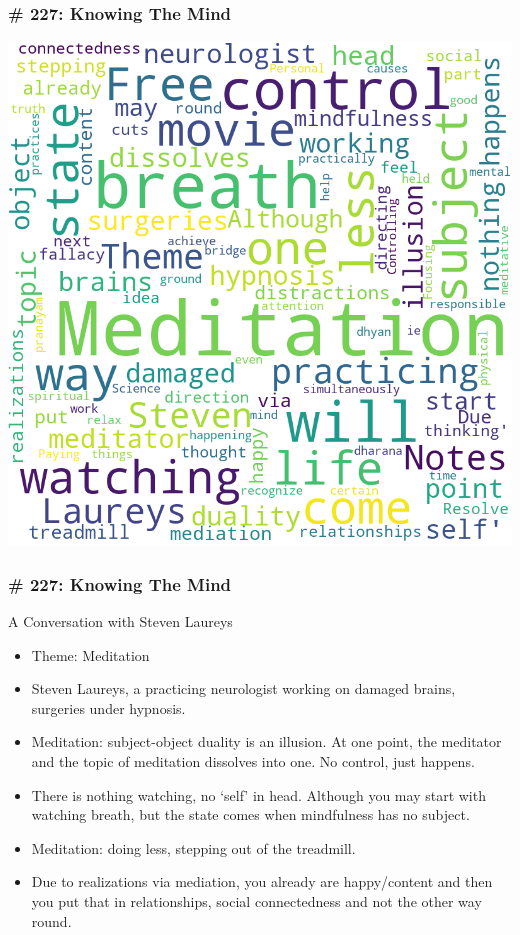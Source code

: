 \begin{frame}[fragile]
\frametitle{\# 227: Knowing The Mind}


 \begin{center}

\includegraphics[width=0.6\linewidth,keepaspectratio]{images/Review_Podcast_MakingSene_227_KnowingTheMind}
\end{center}

\end{frame}

\begin{frame}[fragile]
\frametitle{\# 227: Knowing The Mind}

 A Conversation with Steven Laureys

\begin{itemize}
\item Theme: Meditation
\item  Steven Laureys, a practicing neurologist working on damaged brains, surgeries under hypnosis.
\item  Meditation: subject-object duality is an illusion. At one point, the meditator and the topic of meditation dissolves into one. No control, just happens.
\item  There is nothing watching, no `self' in head. Although you may start with watching breath, but the state comes when mindfulness has no subject.
\item  Meditation: doing less, stepping out of the treadmill.
\item  Due to realizations via mediation, you already are happy/content and then you put that in relationships, social connectedness and not the other way round.
\end{itemize}


\end{frame}

